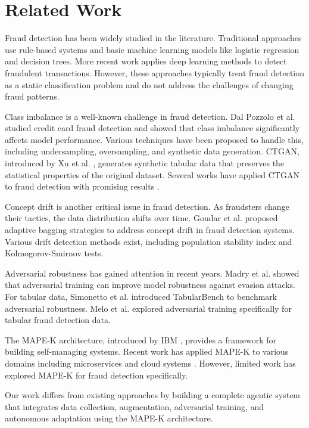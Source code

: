 \section{Related Work}\label{sec:related}

Fraud detection has been widely studied in the literature. Traditional approaches use rule-based systems and basic machine learning models like logistic regression and decision trees. More recent work applies deep learning methods to detect fraudulent transactions. However, these approaches typically treat fraud detection as a static classification problem and do not address the challenges of changing fraud patterns.

Class imbalance is a well-known challenge in fraud detection. Dal Pozzolo et al. \cite{dalpozzolo2015credit} studied credit card fraud detection and showed that class imbalance significantly affects model performance. Various techniques have been proposed to handle this, including undersampling, oversampling, and synthetic data generation. CTGAN, introduced by Xu et al. \cite{xu2019ctgan}, generates synthetic tabular data that preserves the statistical properties of the original dataset. Several works have applied CTGAN to fraud detection with promising results \cite{strelcenia2023synthetic}.

Concept drift is another critical issue in fraud detection. As fraudsters change their tactics, the data distribution shifts over time. Goudar et al. \cite{goudar2026adaptive} proposed adaptive bagging strategies to address concept drift in fraud detection systems. Various drift detection methods exist, including population stability index and Kolmogorov-Smirnov tests.

Adversarial robustness has gained attention in recent years. Madry et al. \cite{madry2018adversarial} showed that adversarial training can improve model robustness against evasion attacks. For tabular data, Simonetto et al. \cite{simonetto2024tabularbench} introduced TabularBench to benchmark adversarial robustness. Melo et al. \cite{melo2023adversarial} explored adversarial training specifically for tabular fraud detection data.

The MAPE-K architecture, introduced by IBM \cite{ibm2005autonomic}, provides a framework for building self-managing systems. Recent work has applied MAPE-K to various domains including microservices \cite{bucchiarone2022mape} and cloud systems \cite{oh2023mape}. However, limited work has explored MAPE-K for fraud detection specifically.

Our work differs from existing approaches by building a complete agentic system that integrates data collection, augmentation, adversarial training, and autonomous adaptation using the MAPE-K architecture.